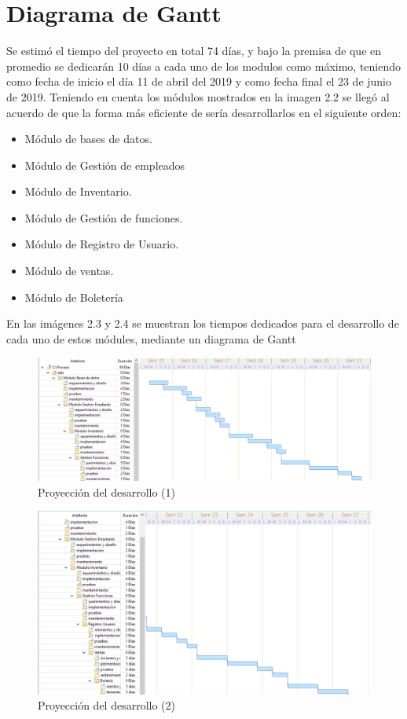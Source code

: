 \section{Diagrama de Gantt}
Se estimó el tiempo del proyecto en total 74 días, y bajo la premisa de que en promedio se dedicarán 10 días a cada uno de los modulos como máximo, teniendo como fecha de inicio el día 11 de abril del 2019 y como fecha final el 23 de junio de 2019.
Teniendo en cuenta los módulos mostrados en la imagen 2.2 se llegó al acuerdo de que la forma más eficiente de sería desarrollarlos en el siguiente orden:
\leavevmode
\linebreak
\begin{itemize}
	\item Módulo de bases de datos.
	\item Módulo de Gestión de empleados
	\item Módulo de Inventario.
	\item Módulo de Gestión de funciones.
	\item Módulo de Registro de Usuario.
	\item Módulo de ventas.
	\item Módulo de Boletería
\end{itemize}
\leavevmode
\linebreak
En las imágenes 2.3 y 2.4 se muestran los tiempos dedicados para el desarrollo de cada uno de estos módules, mediante un diagrama de Gantt
\begin{figure}[h!]
	\centering
\includegraphics[width=1\linewidth]{proyecto/proceso/imgs/modulo1}
	\caption{Proyección del desarrollo (1)}
\end{figure}
\begin{figure}[h!]
	\centering
\includegraphics[width=0.8\linewidth]{proyecto/proceso/imgs/modulo2}
	\caption{Proyección del desarrollo (2)}
\end{figure}

